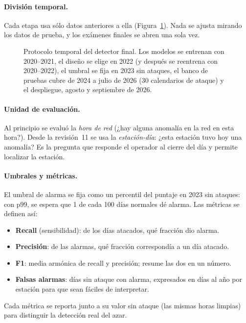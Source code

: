 \documentclass[11pt, letterpaper]{article}
\newcommand{\figurapresentacion}[1]{%
  \adjustbox{max width=\linewidth}{}}
\begin{document}
\paragraph{División temporal.} Cada etapa usa sólo datos anteriores a ella
(Figura~\ref{fig:protocolo}). Nada se ajusta mirando los datos de prueba, y los exámenes
finales se abren una sola vez.

\begin{figure}[H]
  \centering
  \figurapresentacion{protocolo}
  \caption{Protocolo temporal del detector final. Los modelos se entrenan con 2020--2021,
    el diseño se elige en 2022 (y después se reentrena con 2020--2022), el umbral se fija
    en 2023 sin ataques, el banco de pruebas cubre de 2024 a julio de 2026 (30
    calendarios de ataque) y el despliegue, agosto y septiembre de 2026.}
  \label{fig:protocolo}
\end{figure}

\paragraph{Unidad de evaluación.} Al principio se evaluó la \emph{hora de red} (¿hay
alguna anomalía en la red en esta hora?). Desde la revisión~11 se usa la
\emph{estación-día}: ¿esta estación tuvo hoy una anomalía? Es la pregunta que responde el
operador al cierre del día y permite localizar la estación.

\paragraph{Umbrales y métricas.} El umbral de alarma se fija como un percentil del puntaje
en 2023 sin ataques: con p99, se espera que 1 de cada 100 días normales dé alarma. Las
métricas se definen así:
\begin{itemize}
  \item \textbf{Recall} (sensibilidad): de los días atacados, qué fracción dio alarma.
  \item \textbf{Precisión}: de las alarmas, qué fracción correspondía a un día atacado.
  \item \textbf{F1}: media armónica de recall y precisión; resume las dos en un número.
  \item \textbf{Falsas alarmas}: días sin ataque con alarma, expresados en días al año por
    estación para que sean fáciles de interpretar.
\end{itemize}
Cada métrica se reporta junto a su valor sin ataque (las mismas horas limpias) para
distinguir la detección real del azar.
\end{document}
